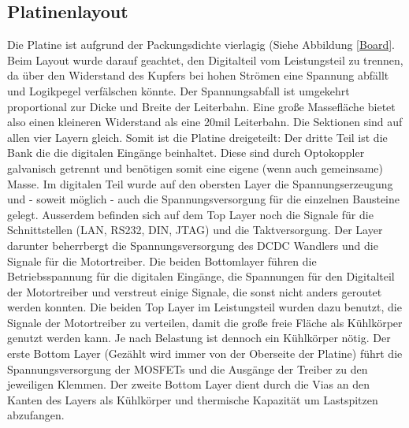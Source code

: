 \documentclass{scrartcl}
\begin{document}
\subsection{Platinenlayout}
Die Platine ist aufgrund der Packungsdichte vierlagig (Siehe Abbildung \ref{Board}. Beim Layout wurde darauf geachtet, den Digitalteil vom Leistungsteil zu trennen, da über den Widerstand des Kupfers bei hohen Strömen eine Spannung abfällt und Logikpegel verfälschen könnte. Der Spannungsabfall ist umgekehrt proportional zur Dicke und Breite der Leiterbahn. Eine große Massefläche bietet also einen kleineren Widerstand als eine 20mil Leiterbahn. \newline
Die Sektionen sind auf allen vier Layern gleich. Somit ist die Platine dreigeteilt: Der dritte Teil ist die Bank die die digitalen Eingänge beinhaltet. Diese sind durch Optokoppler galvanisch getrennt und benötigen somit eine eigene (wenn auch gemeinsame) Masse. Im digitalen Teil wurde auf den obersten Layer die Spannungserzeugung und - soweit möglich - auch die Spannungsversorgung für die einzelnen Bausteine gelegt. Ausserdem befinden sich auf dem Top Layer noch die Signale für die Schnittstellen (LAN, RS232, DIN, JTAG) und die Taktversorgung. Der Layer darunter beherrbergt die Spannungsversorgung des DCDC Wandlers und die Signale für die Motortreiber.
Die beiden Bottomlayer führen die Betriebsspannung für die digitalen Eingänge, die Spannungen für den Digitalteil der Motortreiber und verstreut einige Signale, die sonst nicht anders geroutet werden konnten. \newline
Die beiden Top Layer im Leistungsteil wurden dazu benutzt, die Signale der Motortreiber zu verteilen, damit die große freie Fläche als Kühlkörper genutzt werden kann. Je nach Belastung ist dennoch ein Kühlkörper nötig. Der erste Bottom Layer (Gezählt wird immer von der Oberseite der Platine) führt die Spannungsversorgung der MOSFETs und die Ausgänge der Treiber zu den jeweiligen Klemmen. Der zweite Bottom Layer dient durch die Vias an den Kanten des Layers als Kühlkörper und thermische Kapazität um Lastspitzen abzufangen.
\end{document}
